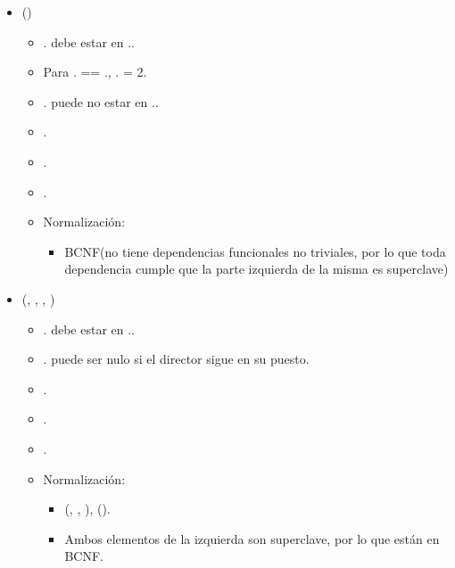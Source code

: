 \begin{itemize}
        \item {}()
            \begin{itemize}
                \item {}. debe estar en
                    ..
                \item Para . == 
                    ., .
                    = 2.
                \item {}. puede no estar en 
                    ..
                \item {}.
                \item {}.
                \item \FK{$\emptyset$}.
                \item Normalización:
                    \begin{itemize}
                        \item BCNF(no tiene dependencias funcionales no 
                            triviales, por lo que toda dependencia cumple que la
                            parte izquierda de la misma es superclave)
                    \end{itemize}
            \end{itemize}

        \item {}(, , ,
                              )
            \begin{itemize}
                \item {}. debe estar en 
                    ..
                \item {}. puede ser nulo si el director
                    sigue en su puesto.
                \item {}.
                \item {}.
                \item {}.
                \item Normalización:
                    \begin{itemize}
                        \item {}
                            {(, , ),
                                ()}.
                        \item Ambos elementos de la izquierda son superclave, 
                            por lo que están en BCNF.
                    \end{itemize}
            \end{itemize}


\end{itemize}
